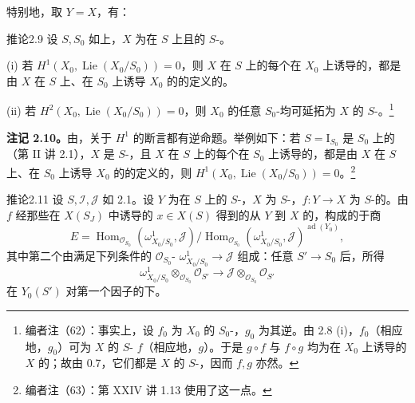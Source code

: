 特别地，取 $Y=X$，有：
\begin{SGAresult}{推论}{2.9}
设 $S,S_0$ 如上，$X$ 为在 $S$ 上且的 $S$-。

(i) 若 $H^1(X_0,\operatorname{Lie}(X_0/S_0))=0$，则 $X$ 在 $S$ 上的每个在 $X_0$ 上诱导的，都是由 $X$ 在 $S$ 上、在 $S_0$ 上诱导 $X_0$ 的的定义的。

(ii) 若 $H^2(X_0,\operatorname{Lie}(X_0/S_0))=0$，则 $X_0$ 的任意 $S_0$-均可延拓为 $X$ 的 $S$-。\footnote{编者注（62）：事实上，设 $f_0$ 为 $X_0$ 的 $S_0$-，$g_0$ 为其逆。由 2.8 (i)，$f_0$（相应地，$g_0$）可为 $X$ 的 $S$- $f$（相应地，$g$）。于是 $g\circ f$ 与 $f\circ g$ 均为在 $X_0$ 上诱导的 $X$ 的；故由 0.7，它们都是 $X$ 的 $S$-，因而 $f,g$ 亦然。}
\end{SGAresult}
\textbf{注记 2.10。}由，关于 $H^1$ 的断言都有逆命题。举例如下：若 $S=\mathrm I_{S_0}$ 是 $S_0$ 上的（第 II 讲 2.1），$X$ 是 $S$-，且 $X$ 在 $S$ 上的每个在 $S_0$ 上诱导的，都是由 $X$ 在 $S$ 上、在 $S_0$ 上诱导 $X_0$ 的的定义的，则 $H^1(X_0,\operatorname{Lie}(X_0/S_0))=0$。\footnote{编者注（63）：第 XXIV 讲 1.13 使用了这一点。}
\begin{SGAresult}{推论}{2.11}
设 $S,\mathcal I,\mathcal J$ 如 2.1。设 $Y$ 为在 $S$ 上的 $S$-，$X$ 为 $S$-，$f:Y\to X$ 为 $S$-的。由 $f$ 经那些在 $X(S_J)$ 中诱导的 $x\in X(S)$ 得到的从 $Y$ 到 $X$ 的，构成的于商
\[
 E=\operatorname{Hom}_{\mathcal O_{S_0}}(\omega^1_{X_0/S_0},\mathcal J)
 \big/\operatorname{Hom}_{\mathcal O_{S_0}}(\omega^1_{X_0/S_0},\mathcal J)^{\operatorname{ad}(Y_0)},
\]
其中第二个由满足下列条件的 $\mathcal O_{S_0}$- $\omega^1_{X_0/S_0}\to\mathcal J$ 组成：任意 $S'\to S_0$ 后，所得
\[
 \omega^1_{X_0/S_0}\otimes_{\mathcal O_{S_0}}\mathcal O_{S'}
 \longrightarrow\mathcal J\otimes_{\mathcal O_{S_0}}\mathcal O_{S'}
\]
在 $Y_0(S')$ 对第一个因子的下。
\end{SGAresult}
